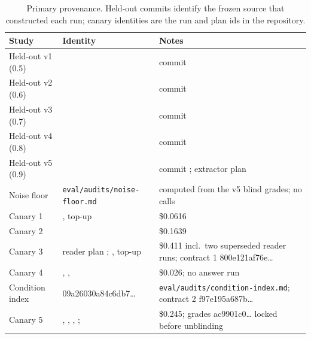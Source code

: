\documentclass[11pt]{article}
\begin{document}
\begin{table}[t]
\centering
\caption{Primary provenance. Held-out commits identify the frozen source that constructed each run; canary identities are the run and plan ids in the repository.}
\label{tab:provenance}
\small
\begin{tabularx}{\textwidth}{lLL}
\toprule
Study & Identity & Notes \\
\midrule
Held-out v1 (0.5) &  & commit {\ttfamily{}} \\
Held-out v2 (0.6) &  & commit {\ttfamily{}} \\
Held-out v3 (0.7) &  & commit {\ttfamily{}} \\
Held-out v4 (0.8) &  & commit {\ttfamily{}} \\
Held-out v5 (0.9) &  & commit {\ttfamily{}}; extractor plan  \\
Noise floor & \texttt{eval/audits/noise-floor.md} & computed from the v5 blind grades; no calls \\
Canary 1 & , top-up  & \$0.0616 \\
Canary 2 &  & \$0.1639 \\
Canary 3 & reader plan ; , top-up  & \$0.411 incl.\ two superseded reader runs; contract 1 {\ttfamily 800e121af76e\ldots} \\
Canary 4 & , ,  & \$0.026; no answer run \\
Condition index & {\ttfamily 09a26030a84c6db7\ldots} & \texttt{eval/audits/condition-index.md}; contract 2 {\ttfamily f97e195a687b\ldots} \\
Canary 5 & , , , ;  & \$0.245; grades {\ttfamily ac9901c0\ldots} locked before unblinding \\
\bottomrule
\end{tabularx}
\end{table}
\end{document}
